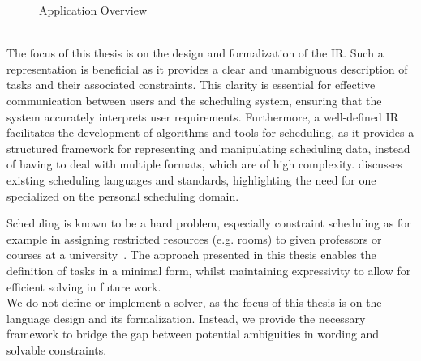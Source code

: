 \begin{figure}[!ht]
      \centering
      \caption{Application Overview}
      \label{fig:application-overview}
\end{figure}
\\
The focus of this thesis is on the design and formalization of the \ac{IR}. Such a representation is beneficial as it provides a clear and unambiguous description of tasks and their associated constraints. This clarity is essential for effective communication between users and the scheduling system, ensuring that the system accurately interprets user requirements. Furthermore, a well-defined \ac{IR} facilitates the development of algorithms and tools for scheduling, as it provides a structured framework for representing and manipulating scheduling data, instead of having to deal with multiple formats, which are of high complexity.  discusses existing scheduling languages and standards, highlighting the need for one specialized on the personal scheduling domain.

Scheduling is known to be a hard problem, especially constraint scheduling as for example in assigning restricted resources (e.g. rooms) to given professors or courses at a university~\cite{bib:2017-diveev}. The approach presented in this thesis enables the definition of tasks in a minimal form, whilst maintaining expressivity to allow for efficient solving in future work. \\
We do not define or implement a solver, as the focus of this thesis is on the language design and its formalization. Instead, we provide the necessary framework to bridge the gap between potential ambiguities in wording and solvable constraints.

